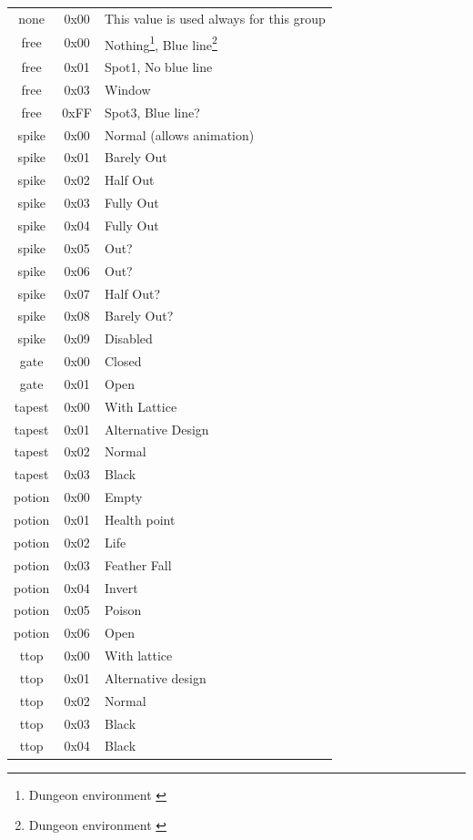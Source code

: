 \documentclass{article}
\begin{document}
\begin{longtable}{ccl}
 none  & 0x00 & This value is used always for this group \\
 free  & 0x00 & Nothing\footnote[1]{Dungeon environment \label{id:de}}, Blue line\footnote[2]{Dungeon environment \label{id:pe}} \\
 free  & 0x01 & Spot1\footnotemark[1], No blue line\footnotemark[2] \\
 free  & 0x03 & Window \\
 free  & 0xFF & Spot3\footnotemark[1], Blue line?\footnotemark[2] \\
 spike & 0x00 & Normal (allows animation) \\
 spike & 0x01 & Barely Out \\
 spike & 0x02 & Half Out \\
 spike & 0x03 & Fully Out \\
 spike & 0x04 & Fully Out \\
 spike & 0x05 & Out? \\
 spike & 0x06 & Out? \\
 spike & 0x07 & Half Out? \\
 spike & 0x08 & Barely Out? \\
 spike & 0x09 & Disabled \\
 gate  & 0x00 & Closed \\
 gate  & 0x01 & Open \\
 tapest & 0x00 & With Lattice\footnotemark[2] \\
 tapest & 0x01 & Alternative Design\footnotemark[2] \\
 tapest & 0x02 & Normal\footnotemark[2] \\
 tapest & 0x03 & Black\footnotemark[2] \\
 potion & 0x00 & Empty \\
 potion & 0x01 & Health point \\
 potion & 0x02 & Life \\
 potion & 0x03 & Feather Fall \\
 potion & 0x04 & Invert \\
 potion & 0x05 & Poison \\
 potion & 0x06 & Open \\
 ttop  & 0x00 & With lattice\footnotemark[2] \\
 ttop  & 0x01 & Alternative design\footnotemark[2] \\
 ttop  & 0x02 & Normal\footnotemark[2] \\
 ttop  & 0x03 & Black\footnotemark[2] \\
 ttop  & 0x04 & Black\footnotemark[2] \\

\end{longtable}
\end{document}
